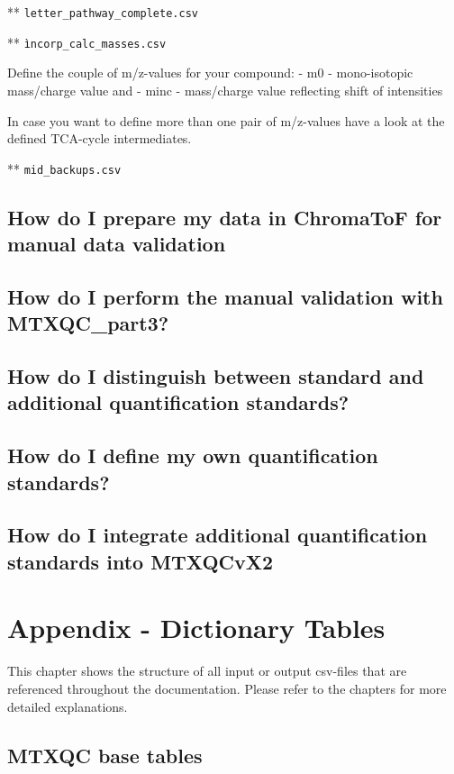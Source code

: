 \documentclass[]{book}
\theoremstyle{definition}
\theoremstyle{definition}
\theoremstyle{definition}
\theoremstyle{remark}
\begin{document}
** \texttt{letter\_pathway\_complete.csv}

** \texttt{ìncorp\_calc\_masses.csv}

Define the couple of m/z-values for your compound: - m0 - mono-isotopic
mass/charge value and - minc - mass/charge value reflecting shift of
intensities

In case you want to define more than one pair of m/z-values have a look
at the defined TCA-cycle intermediates.

** \texttt{mid\_backups.csv}

\section{How do I prepare my data in ChromaToF for manual data
validation}\label{howmanval-chroma}

\section{How do I perform the manual validation with
MTXQC\_part3?}\label{howmanval-part3}

\section{How do I distinguish between standard and additional
quantification standards?}\label{quantquant}

\section{How do I define my own quantification
standards?}\label{quantind}

\section{How do I integrate additional quantification standards into
MTXQCvX2}\label{addqadds}

\chapter{Appendix - Dictionary Tables}\label{tables}

This chapter shows the structure of all input or output csv-files that
are referenced throughout the documentation. Please refer to the
chapters for more detailed explanations.

\section{MTXQC base tables}\label{mtxqc-base-tables}
\end{document}
